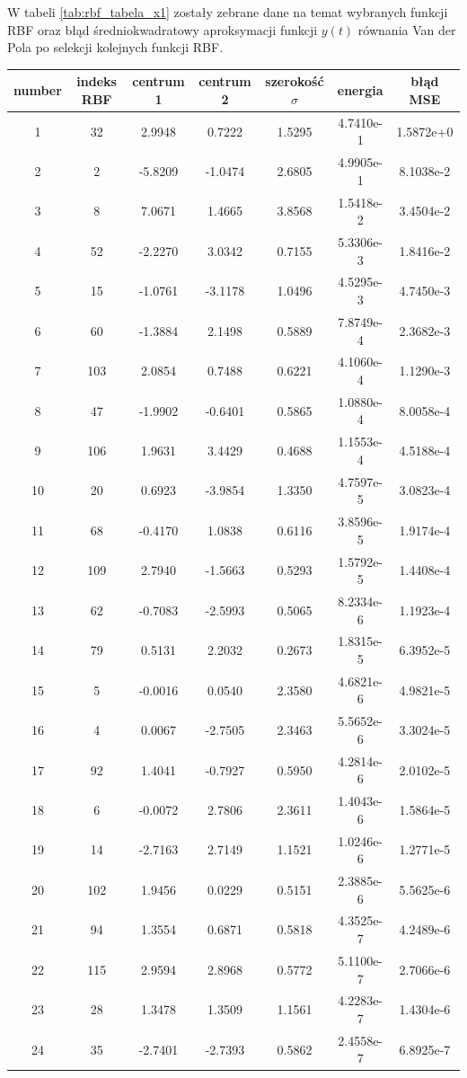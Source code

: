 W tabeli \ref{tab:rbf_tabela_x1} zostały zebrane dane na temat wybranych funkcji RBF oraz błąd średniokwadratowy aproksymacji funkcji $y(t)$ równania Van der Pola po selekcji kolejnych funkcji RBF.
\begin{table}[ht!]
\centering

\begin{tabular}{ | c| c| c| c| c| c| c| }
\hline
number & indeks RBF & centrum 1 & centrum 2 & szerokość $\sigma$ & energia      & błąd MSE \\ \hline    
	
 1 &  32  &  2.9948  &  0.7222  &  1.5295  &  4.7410e-1 & 1.5872e+0 \\
 2 &   2  & -5.8209  & -1.0474  &  2.6805  &  4.9905e-1 & 8.1038e-2 \\
 3 &   8  &  7.0671  &  1.4665  &  3.8568  &  1.5418e-2 & 3.4504e-2 \\
 4 &  52  & -2.2270  &  3.0342  &  0.7155  &  5.3306e-3 & 1.8416e-2 \\
 5 &  15  & -1.0761  & -3.1178  &  1.0496  &  4.5295e-3 & 4.7450e-3 \\
 6 &  60  & -1.3884  &  2.1498  &  0.5889  &  7.8749e-4 & 2.3682e-3 \\
 7 & 103  &  2.0854  &  0.7488  &  0.6221  &  4.1060e-4 & 1.1290e-3 \\
 8 &  47  & -1.9902  & -0.6401  &  0.5865  &  1.0880e-4 & 8.0058e-4 \\
 9 & 106  &  1.9631  &  3.4429  &  0.4688  &  1.1553e-4 & 4.5188e-4 \\
10 &  20  &  0.6923  & -3.9854  &  1.3350  &  4.7597e-5 & 3.0823e-4 \\
11 &  68  & -0.4170  &  1.0838  &  0.6116  &  3.8596e-5 & 1.9174e-4 \\
12 & 109  &  2.7940  & -1.5663  &  0.5293  &  1.5792e-5 & 1.4408e-4 \\
13 &  62  & -0.7083  & -2.5993  &  0.5065  &  8.2334e-6 & 1.1923e-4 \\
14 &  79  &  0.5131  &  2.2032  &  0.2673  &  1.8315e-5 & 6.3952e-5 \\
15 &   5  & -0.0016  &  0.0540  &  2.3580  &  4.6821e-6 & 4.9821e-5 \\
16 &   4  &  0.0067  & -2.7505  &  2.3463  &  5.5652e-6 & 3.3024e-5 \\
17 &  92  &  1.4041  & -0.7927  &  0.5950  &  4.2814e-6 & 2.0102e-5 \\
18 &   6  & -0.0072  &  2.7806  &  2.3611  &  1.4043e-6 & 1.5864e-5 \\
19 &  14  & -2.7163  &  2.7149  &  1.1521  &  1.0246e-6 & 1.2771e-5 \\
20 & 102  &  1.9456  &  0.0229  &  0.5151  &  2.3885e-6 & 5.5625e-6 \\
21 &  94  &  1.3554  &  0.6871  &  0.5818  &  4.3525e-7 & 4.2489e-6 \\
22 & 115  &  2.9594  &  2.8968  &  0.5772  &  5.1100e-7 & 2.7066e-6 \\
23 &  28  &  1.3478  &  1.3509  &  1.1561  &  4.2283e-7 & 1.4304e-6 \\
24 &  35  & -2.7401  & -2.7393  &  0.5862  &  2.4558e-7 & 6.8925e-7 \\
    \hline
\end{tabular}


\end{table}
